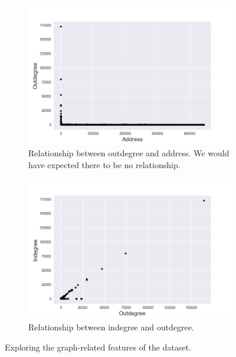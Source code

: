 \documentclass{article} %
\begin{document}
\begin{figure}
\centering
\begin{subfigure}{.5\textwidth}
    \centering
    \includegraphics[width=1\linewidth]{figures/degree_address}
    \caption{\small Relationship between outdegree and address. We would have expected there to be no relationship.}
    \label{fig:degree_address}
\end{subfigure}%
\begin{subfigure}{.5\textwidth}
    \centering
    \includegraphics[width=1\linewidth]{figures/in_out_degree}
    \caption{\small Relationship between indegree and outdegree.}
    \label{fig:in_out_degree}
\end{subfigure}
\caption{\small Exploring the graph-related features of the dataset.}
\label{fig:test}
\end{figure}
\end{document}
